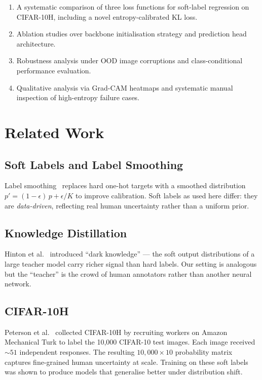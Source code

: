 \documentclass[11pt,a4paper]{article}
\begin{document}
\begin{enumerate}[noitemsep]
  \item A systematic comparison of three loss functions for soft-label
        regression on CIFAR-10H, including a novel entropy-calibrated KL loss.
  \item Ablation studies over backbone initialisation strategy and prediction
        head architecture.
  \item Robustness analysis under OOD image corruptions and class-conditional
        performance evaluation.
  \item Qualitative analysis via Grad-CAM heatmaps and systematic manual
        inspection of high-entropy failure cases.
\end{enumerate}

\section{Related Work}

\subsection{Soft Labels and Label Smoothing}

Label smoothing~\cite{szegedy2016rethinking} replaces hard one-hot targets
with a smoothed distribution $p' = (1-\epsilon)\,p + \epsilon/K$ to improve
calibration.
Soft labels as used here differ: they are \emph{data-driven}, reflecting real
human uncertainty rather than a uniform prior.

\subsection{Knowledge Distillation}

Hinton et al.~\cite{hinton2015distilling} introduced ``dark knowledge'' —
the soft output distributions of a large teacher model carry richer signal
than hard labels.
Our setting is analogous but the ``teacher'' is the crowd of human annotators
rather than another neural network.

\subsection{CIFAR-10H}

Peterson et al.~\cite{peterson2019human} collected CIFAR-10H by recruiting
workers on Amazon Mechanical Turk to label the 10,000 CIFAR-10 test images.
Each image received ${\sim}51$ independent responses.
The resulting $10{,}000 \times 10$ probability matrix captures fine-grained
human uncertainty at scale.
Training on these soft labels was shown to produce models that generalise
better under distribution shift.
\end{document}
